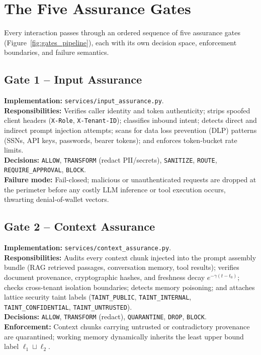 \documentclass[11pt,a4paper]{article}
\newcommand{\fp}[1]{\texttt{\scriptsize #1}}
\begin{document}
\section{The Five Assurance Gates}
Every interaction passes through an ordered sequence of five assurance gates (Figure~\ref{fig:gates_pipeline}), each with its own decision space, enforcement boundaries, and failure semantics.

\subsection{Gate 1 -- Input Assurance}
\textbf{Implementation:} \fp{services/input\_assurance.py}.\\
\textbf{Responsibilities:} Verifies caller identity and token authenticity; strips spoofed client headers (\texttt{X-Role}, \texttt{X-Tenant-ID}); classifies inbound intent; detects direct and indirect prompt injection attempts; scans for data loss prevention (DLP) patterns (SSNs, API keys, passwords, bearer tokens); and enforces token-bucket rate limits.\\
\textbf{Decisions:} \texttt{ALLOW}, \texttt{TRANSFORM} (redact PII/secrets), \texttt{SANITIZE}, \texttt{ROUTE}, \texttt{REQUIRE\_APPROVAL}, \texttt{BLOCK}.\\
\textbf{Failure mode:} Fail-closed; malicious or unauthenticated requests are dropped at the perimeter before any costly LLM inference or tool execution occurs, thwarting denial-of-wallet vectors.

\subsection{Gate 2 -- Context Assurance}
\textbf{Implementation:} \fp{services/context\_assurance.py}.\\
\textbf{Responsibilities:} Audits every context chunk injected into the prompt assembly bundle (RAG retrieved passages, conversation memory, tool results); verifies document provenance, cryptographic hashes, and freshness decay $e^{-\gamma(t-t_0)}$; checks cross-tenant isolation boundaries; detects memory poisoning; and attaches lattice security taint labels (\texttt{TAINT\_PUBLIC}, \texttt{TAINT\_INTERNAL}, \texttt{TAINT\_CONFIDENTIAL}, \texttt{TAINT\_UNTRUSTED}).\\
\textbf{Decisions:} \texttt{ALLOW}, \texttt{TRANSFORM} (redact), \texttt{QUARANTINE}, \texttt{DROP}, \texttt{BLOCK}.\\
\textbf{Enforcement:} Context chunks carrying untrusted or contradictory provenance are quarantined; working memory dynamically inherits the least upper bound label $\ell_1 \sqcup \ell_2$.
\end{document}
